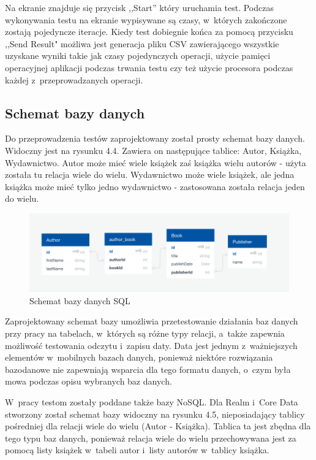 \newpage

Na ekranie znajduje się przycisk ,,Start''  który uruchamia test. Podczas wykonywania testu na ekranie wypisywane są czasy, w~których zakończone zostają pojedyncze iteracje. Kiedy test dobiegnie końca za pomocą przycisku ,,Send Result" możliwa jest generacja pliku CSV zawierającego wszystkie uzyskane wyniki takie jak czasy pojedynczych operacji, użycie pamięci operacyjnej aplikacji podczas trwania testu czy też użycie procesora podczas każdej z~przeprowadzanych operacji. 

\subsection{Schemat bazy danych}

Do przeprowadzenia testów zaprojektowany został prosty schemat bazy danych. Widoczny jest na rysunku 4.4. Zawiera on następujące tablice: Autor, Książka, Wydawnictwo. Autor może mieć wiele książek zaś książka wielu autorów - użyta została tu relacja wiele do wielu. Wydawnictwo może wiele książek, ale jedna książka może mieć tylko jedno wydawnictwo - zastosowana została relacja jeden do wielu. 

\begin{figure}[h]
\centering
	\includegraphics[width=\linewidth]{img/database/sql-scheme.png}
	\caption{Schemat bazy danych SQL}
	\label{fig: sql_data_schame}
\end{figure}

Zaprojektowany schemat bazy umożliwia przetestowanie działania baz danych przy pracy na tabelach, w~których są różne typy relacji, a~także zapewnia możliwość testowania odczytu i~zapisu daty. Data jest jednym z~ważniejszych elementów w~mobilnych bazach danych, ponieważ niektóre rozwiązania bazodanowe nie zapewniają wsparcia dla tego formatu danych, o~czym była mowa podczas opisu wybranych baz danych. \par 

 W~pracy testom zostały poddane także bazy NoSQL. Dla Realm i~Core Data stworzony został schemat bazy widoczny na rysunku 4.5, nieposiadający tablicy pośredniej dla relacji wiele do wielu (Autor - Książka). Tablica ta jest zbędna dla tego typu baz danych, ponieważ relacja wiele do wielu przechowywana jest za pomocą listy książek w~tabeli autor i~listy autorów w~tablicy książka. 

